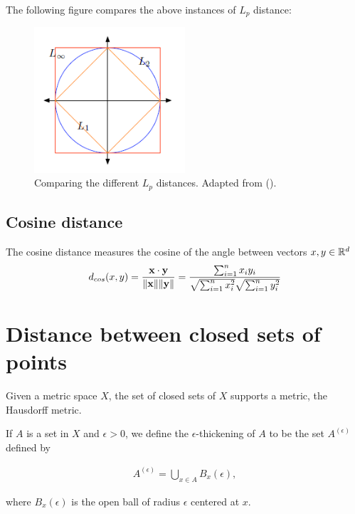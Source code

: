 The following figure compares the above instances of $L_p$ distance:
    \begin{figure}[H]
        \centering
            \includegraphics[width=0.5\textwidth]{figures/Lp-distances.png}
            \caption{Comparing the different $L_p$ distances. Adapted from (\cite{phillips_notes}).}
    \end{figure}

\subsection{Cosine distance}
The cosine distance measures the cosine of the angle between vectors $x,y\in \mathbb R^d$
\begin{align}
    d_{cos}(x,y) = \frac{\mathbf{x} \cdot \mathbf{y}}{\|\mathbf{x}\| \|\mathbf{y}\|} = \frac{\sum_{i =1}^n x_i y_i}{\sqrt{\sum_{i =1}^n x_i^2} \sqrt{\sum_{i =1}^n y_i^2}}
\end{align}

\section{Distance between closed sets of points}

\begin{defn}
Given a metric space $X$, the set of closed sets of $X$ supports a metric, the Hausdorff metric.

If $A$ is a set in $X$ and $\epsilon > 0$, we define the $\epsilon$-thickening of $A$ to be the set $A^{(\epsilon)}$ defined by

\begin{align}
    A^{(\epsilon)} =\bigcup_{x\in A} B_x(\epsilon),
\end{align}

where $B_x(\epsilon)$ is the open ball of radius $\epsilon$ centered at $x$. 
\end{defn}

